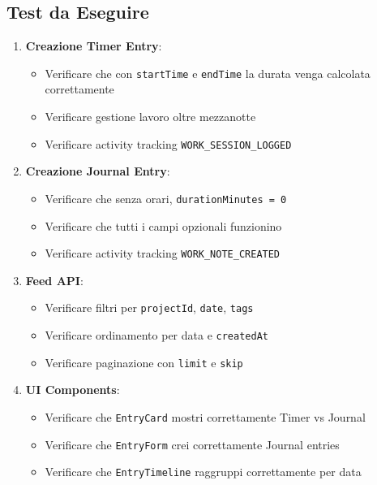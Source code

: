 \documentclass[11pt,a4paper]{article}
\begin{document}
\subsection{Test da Eseguire}

\begin{enumerate}
    \item \textbf{Creazione Timer Entry}:
    \begin{itemize}
        \item Verificare che con \texttt{startTime} e \texttt{endTime} la durata venga calcolata correttamente
        \item Verificare gestione lavoro oltre mezzanotte
        \item Verificare activity tracking \texttt{WORK_SESSION_LOGGED}
    \end{itemize}
    
    \item \textbf{Creazione Journal Entry}:
    \begin{itemize}
        \item Verificare che senza orari, \texttt{durationMinutes = 0}
        \item Verificare che tutti i campi opzionali funzionino
        \item Verificare activity tracking \texttt{WORK_NOTE_CREATED}
    \end{itemize}
    
    \item \textbf{Feed API}:
    \begin{itemize}
        \item Verificare filtri per \texttt{projectId}, \texttt{date}, \texttt{tags}
        \item Verificare ordinamento per data e \texttt{createdAt}
        \item Verificare paginazione con \texttt{limit} e \texttt{skip}
    \end{itemize}
    
    \item \textbf{UI Components}:
    \begin{itemize}
        \item Verificare che \texttt{EntryCard} mostri correttamente Timer vs Journal
        \item Verificare che \texttt{EntryForm} crei correttamente Journal entries
        \item Verificare che \texttt{EntryTimeline} raggruppi correttamente per data
    \end{itemize}
\end{enumerate}
\end{document}
